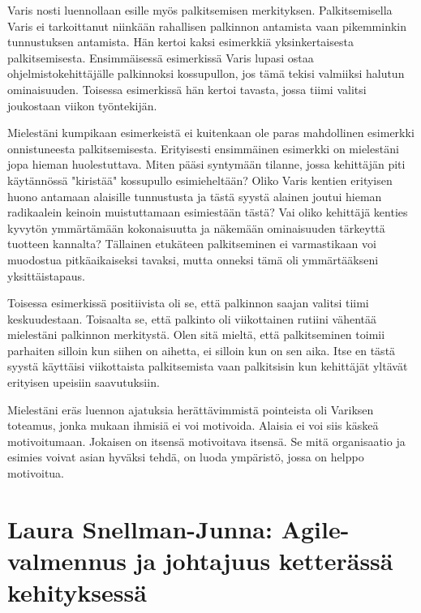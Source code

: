 \documentclass[a4paper]{article}
\begin{document}
Varis nosti luennollaan esille myös palkitsemisen merkityksen. Palkitsemisella Varis ei tarkoittanut niinkään rahallisen palkinnon antamista vaan pikemminkin tunnustuksen antamista. Hän kertoi kaksi esimerkkiä yksinkertaisesta palkitsemisesta. Ensimmäisessä esimerkissä Varis lupasi ostaa ohjelmistokehittäjälle palkinnoksi kossupullon, jos tämä tekisi valmiiksi halutun ominaisuuden. Toisessa esimerkissä hän kertoi tavasta, jossa tiimi valitsi joukostaan viikon työntekijän.

Mielestäni kumpikaan esimerkeistä ei kuitenkaan ole paras mahdollinen esimerkki onnistuneesta palkitsemisesta. Erityisesti ensimmäinen esimerkki on mielestäni jopa hieman huolestuttava. Miten pääsi syntymään tilanne, jossa kehittäjän piti käytännössä "kiristää" kossupullo esimieheltään? Oliko Varis kentien erityisen huono antamaan alaisille tunnustusta ja tästä syystä alainen joutui hieman radikaalein keinoin muistuttamaan esimiestään tästä? Vai oliko kehittäjä kenties kyvytön ymmärtämään kokonaisuutta ja näkemään ominaisuuden tärkeyttä tuotteen kannalta? Tällainen etukäteen palkitseminen ei varmastikaan voi muodostua pitkäaikaiseksi tavaksi, mutta onneksi tämä oli ymmärtääkseni yksittäistapaus.

Toisessa esimerkissä positiivista oli se, että palkinnon saajan valitsi tiimi keskuudestaan. Toisaalta se, että palkinto oli viikottainen rutiini vähentää mielestäni palkinnon merkitystä. Olen sitä mieltä, että palkitseminen toimii parhaiten silloin kun siihen on aihetta, ei silloin kun on sen aika. Itse en tästä syystä käyttäisi viikottaista palkitsemista vaan palkitsisin kun kehittäjät yltävät erityisen upeisiin saavutuksiin.

Mielestäni eräs luennon ajatuksia herättävimmistä pointeista oli Variksen toteamus, jonka mukaan ihmisiä ei voi motivoida. Alaisia ei voi siis käskeä motivoitumaan. Jokaisen on itsensä motivoitava itsensä. Se mitä organisaatio ja esimies voivat asian hyväksi tehdä, on luoda ympäristö, jossa on helppo motivoitua.







\section{Laura Snellman-Junna: Agile-valmennus ja johtajuus ketterässä kehityksessä}
\end{document}

